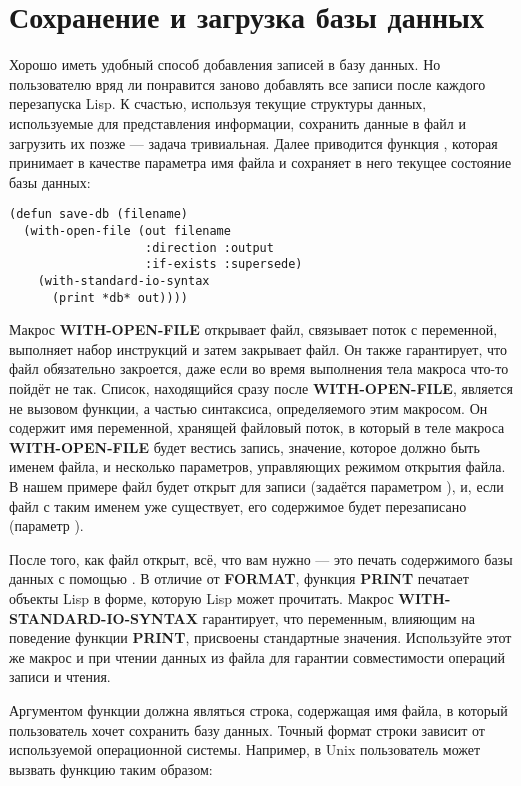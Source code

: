 \section{Сохранение и загрузка базы данных}

Хорошо иметь удобный способ добавления записей в базу данных. Но пользователю вряд ли
понравится заново добавлять все записи после каждого перезапуска Lisp. К счастью,
используя текущие структуры данных, используемые для представления информации, сохранить
данные в файл и загрузить их позже --- задача тривиальная. Далее приводится функция
, которая принимает в качестве параметра имя файла и сохраняет в него
текущее состояние базы данных:

\begin{lstlisting}
(defun save-db (filename)
  (with-open-file (out filename
                   :direction :output
                   :if-exists :supersede)
    (with-standard-io-syntax
      (print *db* out))))
\end{lstlisting}

Макрос \textbf{WITH-OPEN-FILE} открывает файл, связывает поток с переменной, выполняет
набор инструкций и затем закрывает файл. Он также гарантирует, что файл обязательно
закроется, даже если во время выполнения тела макроса что-то пойдёт не так. Список,
находящийся сразу после \textbf{WITH-OPEN-FILE}, является не вызовом функции, а частью
синтаксиса, определяемого этим макросом. Он содержит имя переменной, хранящей файловый
поток, в который в теле макроса \textbf{WITH-OPEN-FILE} будет вестись запись, значение,
которое должно быть именем файла, и несколько параметров, управляющих режимом открытия
файла. В нашем примере файл будет открыт для записи (задаётся параметром 
), и, если файл с таким именем уже существует, его содержимое будет
перезаписано (параметр  ).

После того, как файл открыт, всё, что вам нужно --- это печать содержимого базы данных с
помощью . В отличие от \textbf{FORMAT}, функция \textbf{PRINT}
печатает объекты Lisp в форме, которую Lisp может прочитать. Макрос
\textbf{WITH-STANDARD-IO-SYNTAX} гарантирует, что переменным, влияющим на поведение
функции \textbf{PRINT}, присвоены стандартные значения. Используйте этот же макрос и при
чтении данных из файла для гарантии совместимости операций записи и чтения.

Аргументом функции  должна являться строка, содержащая имя файла, в который
пользователь хочет сохранить базу данных. Точный формат строки зависит от используемой
операционной системы. Например, в Unix пользователь может вызвать функцию 
таким образом:

